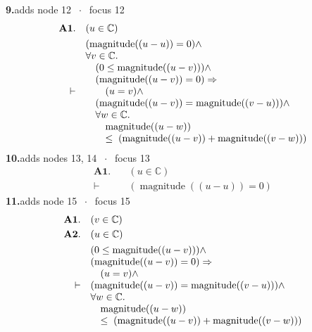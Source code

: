 \documentclass[11pt]{article}
\theoremstyle{plain}
\newcommand{\fit}[1]{\resizebox{\ifdim\width>\linewidth\linewidth\else\width\fi}{!}{#1}}
\begin{document}
\medskip\noindent\textbf{9.}\quad \fit{\texttt{(di)}}\hfill{\small adds node 12 $\;\cdot\;$ focus 12}\\[2pt]
\begin{align*}
  \mathbf{A1.}\quad & (u \in \mathbb{C}) \\
  \vdash\quad & \begin{array}{@{}l@{}} (\operatorname{magnitude}((u - u)) = 0) \wedge \\ \forall v \in \mathbb{C}. \\ \quad (0 \leq \operatorname{magnitude}((u - v))) \wedge \\ \quad (\operatorname{magnitude}((u - v)) = 0) \Rightarrow  \\ \quad \quad (u = v) \wedge \\ \quad (\operatorname{magnitude}((u - v)) = \operatorname{magnitude}((v - u))) \wedge \\ \quad \forall w \in \mathbb{C}. \\ \quad \quad \operatorname{magnitude}((u - w)) \\ \quad \quad \leq\; (\operatorname{magnitude}((u - v)) + \operatorname{magnitude}((v - w))) \end{array}
\end{align*}
\medskip\noindent\textbf{10.}\quad \fit{\texttt{(di)}}\hfill{\small adds nodes 13, 14 $\;\cdot\;$ focus 13}\\[2pt]
\begin{align*}
  \mathbf{A1.}\quad & (u \in \mathbb{C}) \\
  \vdash\quad & (\operatorname{magnitude}((u - u)) = 0)
\end{align*}
\medskip\noindent\textbf{11.}\quad \fit{\texttt{(di)}}\hfill{\small adds node 15 $\;\cdot\;$ focus 15}\\[2pt]
\begin{align*}
  \mathbf{A1.}\quad & (v \in \mathbb{C}) \\
  \mathbf{A2.}\quad & (u \in \mathbb{C}) \\
  \vdash\quad & \begin{array}{@{}l@{}} (0 \leq \operatorname{magnitude}((u - v))) \wedge \\ (\operatorname{magnitude}((u - v)) = 0) \Rightarrow  \\ \quad (u = v) \wedge \\ (\operatorname{magnitude}((u - v)) = \operatorname{magnitude}((v - u))) \wedge \\ \forall w \in \mathbb{C}. \\ \quad \operatorname{magnitude}((u - w)) \\ \quad \leq\; (\operatorname{magnitude}((u - v)) + \operatorname{magnitude}((v - w))) \end{array}
\end{align*}
\end{document}
